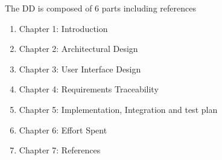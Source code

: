 \qquad The DD is composed of 6 parts including references
\begin{enumerate}
\item Chapter 1: Introduction
\item Chapter 2: Architectural Design
\item Chapter 3: User Interface Design
\item Chapter 4: Requirements Traceability
\item Chapter 5: Implementation, Integration and test plan
\item Chapter 6: Effort Spent
\item Chapter 7: References
\end{enumerate}